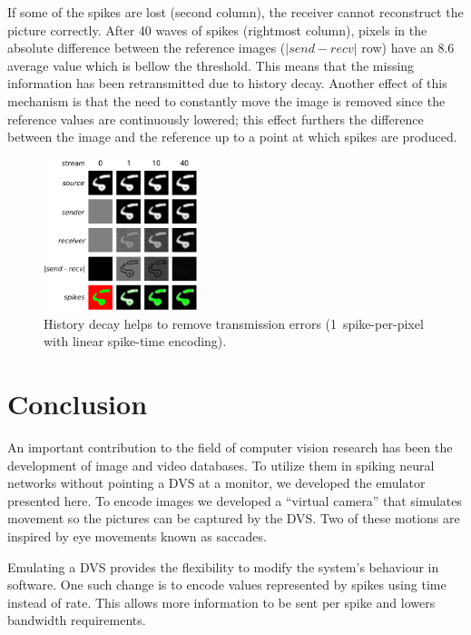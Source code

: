\documentclass[conference]{IEEEtran}
\begin{document}
If some of the spikes are lost (second column), the receiver cannot reconstruct the picture correctly. After 40 waves of spikes (rightmost column),  pixels in the absolute difference between the reference images ($|send-recv|$ row) have an 8.6 average value which is bellow the threshold. This means that the missing information has been retransmitted due to history decay. Another effect of this mechanism is that the need to constantly move the image is removed since the reference values are continuously lowered; this effect furthers the difference between the image and the reference up to a point at which spikes are produced.

\setcounter{figure}{13} %
\begin{figure}[htb]
  \centering
  
  \includegraphics[width=0.4\textwidth]{history_decay}
  \caption{History decay helps to remove transmission errors (1~spike-per-pixel with linear spike-time encoding).}
  \label{fig:history_decay}
\end{figure}


\section{Conclusion}
\label{sec:conclusions}
An important contribution to the field of computer vision research has been the development of image and video databases. To utilize them in spiking neural networks without pointing a DVS at a monitor, we developed the emulator presented here. To encode images we developed a ``virtual camera'' that simulates movement so the pictures can be captured by the DVS. Two of these motions are inspired by eye movements known as saccades.

Emulating a DVS provides the flexibility to modify the system's behaviour in software. One such change is to encode values represented by spikes using time instead of rate. This allows more information to be sent per spike and lowers bandwidth requirements. 
\end{document}

